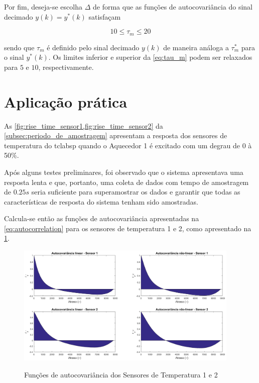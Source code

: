 \begin{apendicesenv}
Por fim, deseja-se escolha $\Delta$ de forma que as funções de autocovariância do sinal decimado $y(k) = y^*(k)$
satisfaçam

\begin{equation}
    \label{eq:tau_m}
    10 \leq \tau_m \leq 20
\end{equation}

\noindent
sendo que $\tau_m$ é definido pelo sinal decimado $y(k)$ de maneira análoga a $\tau_m^*$ para o
sinal $y^*(k)$. Os limites inferior e superior da \cref{eq:tau_m} podem ser relaxados para
$5$ e $10$, respectivamente.

\section{Aplicação prática}
\label{ch:using_sampling_time_with_autocorrelation}

As \cref{fig:rise_time_sensor1,fig:rise_time_sensor2} da \cref{subsec:periodo_de_amostragem}
apresentam a resposta dos sensores de temperatura do \acrshort{tclabsp} quando o Aquecedor 1 é
excitado com um degrau de 0 à 50\%.

Após alguns testes preliminares, foi observado que o sistema apresentava uma resposta lenta
e que, portanto, uma coleta de dados com tempo de amostragem de $0.25s$ seria suficiente para
superamostrar os dados e garantir que todas as características de resposta do sistema tenham
sido amostradas.

Calcula-se então as funções de autocovariância apresentadas na \cref{eq:autocorrelation} para os
sensores de temperatura 1 e 2, como apresentado na \cref{fig:autocorrelationS1S2}.

\begin{figure}[h]
	\caption{Funções de autocovariância dos Sensores de Temperatura 1 e 2}
	\begin{center}
		\includegraphics[width=0.95\textwidth]{./5_images/AutocorrelationS1S2.png} 
		\label{fig:autocorrelationS1S2}
	\end{center}
	\centering
\end{figure}


\end{apendicesenv}
